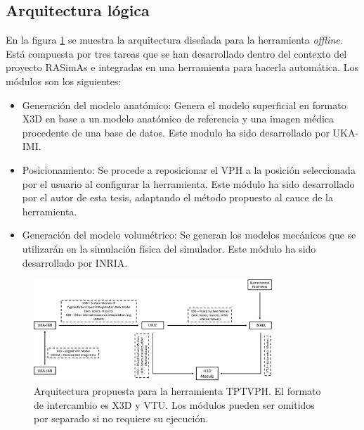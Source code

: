 \subsection{Arquitectura lógica}
\label{rasim:arq}
En la figura \ref{fig:toolarq} se muestra la arquitectura diseñada para la herramienta \emph{offline}. Está compuesta por tres tareas que se han desarrollado dentro del contexto del proyecto \ac{RASimAs} e integradas en una herramienta para hacerla automática. Los módulos son los siguientes: 
\begin{itemize}
    \item Generación del modelo anatómico:
    Genera el modelo superficial en formato \ac{X3D} en base a un modelo anatómico de referencia y una imagen médica procedente de una base de datos. Este modulo ha sido desarrollado por \ac{UKA-IMI}.
    \item Posicionamiento:
    Se procede a reposicionar el \ac{VPH} a la posición seleccionada por el usuario al configurar la herramienta. Este módulo ha sido desarrollado por el autor de esta tesis, adaptando el método propuesto al cauce de la herramienta.
    \item Generación del modelo volumétrico:
    Se generan los modelos mecánicos que se utilizarán en la simulación física del simulador. Este módulo ha sido desarrollado por \ac{INRIA}.
\end{itemize}

\begin{figure}
    \centering
    \includegraphics[width=0.8\textwidth]{IMG/toolkitarq.png}
    \caption{Arquitectura propuesta para la herramienta \ac{TPTVPH}. El formato de intercambio es \ac{X3D} y \ac{VTU}. Los módulos pueden ser omitidos por separado si no requiere su ejecución.}
    \label{fig:toolarq}
\end{figure}

